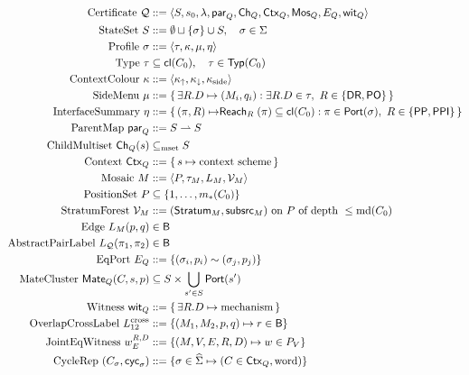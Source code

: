 \documentclass[11pt]{article}
\newcommand{\Base}{\mathsf{B}}
\newcommand{\DR}{\mathsf{DR}}
\newcommand{\PO}{\mathsf{PO}}
\newcommand{\PP}{\mathsf{PP}}
\newcommand{\PPI}{\mathsf{PPI}}
\newcommand{\Cl}{\mathsf{cl}}
\newcommand{\Typ}{\mathsf{Typ}}
\newcommand{\Q}{\mathcal Q}
\newcommand{\Mos}{\mathsf{Mos}}
\newcommand{\Ctx}{\mathsf{Ctx}}
\newcommand{\parr}{\mathsf{par}}
\newcommand{\Port}{\mathsf{Port}}
\newcommand{\Mate}{\mathsf{Mate}}
\newcommand{\Reach}{\mathrel{\mathsf{Reach}}}
\newcommand{\Stratum}{\mathsf{Stratum}}
\newcommand{\Subsrc}{\mathsf{subsrc}}
\newcommand{\extSigma}{\widehat\Sigma}
\newcommand{\md}{\operatorname{md}}
\begin{document}
\begin{align*}
  \text{Certificate}\ \Q
    &::= \langle S, s_0, \lambda, \parr_Q, \mathsf{Ch}_Q, \Ctx_Q,
            \Mos_Q, E_Q, \mathsf{wit}_Q \rangle \\
  \text{StateSet}\ S
    &::= \emptyset \sqcup \{\sigma\}\cup S,\quad \sigma\in\Sigma \\
  \text{Profile}\ \sigma
    &::= \langle \tau, \kappa, \mu, \eta \rangle \\
  \text{Type}\ \tau
    &\subseteq \Cl(C_0),\quad \tau\in\Typ(C_0) \\
  \text{ContextColour}\ \kappa
    &::= \langle \kappa_\uparrow,\kappa_\downarrow,
              \kappa_{\mathrm{side}}\rangle \\
  \text{SideMenu}\ \mu
    &::= \{\,\exists R.D\mapsto(M_i,q_i):
              \exists R.D\in\tau,\ R\in\{\DR,\PO\}\,\} \\
  \text{InterfaceSummary}\ \eta
    &::= \{\,(\pi,R)\mapsto \Reach_R(\pi)\subseteq\Cl(C_0):
              \pi\in\Port(\sigma),\ R\in\{\PP,\PPI\}\,\} \\
  \text{ParentMap}\ \parr_Q
    &::= S\rightharpoonup S \\
  \text{ChildMultiset}\ \mathsf{Ch}_Q(s)
    &\subseteq_{\mathrm{mset}} S \\
  \text{Context}\ \Ctx_Q
    &::= \{\,s\mapsto\text{context scheme}\,\} \\
  \text{Mosaic}\ M
    &::= \langle P,\tau_M, L_M, \mathcal V_M\rangle \\
  \text{PositionSet}\ P
    &\subseteq \{1,\dots,m_*(C_0)\} \\
  \text{StratumForest}\ \mathcal V_M
    &::= (\Stratum_M, \Subsrc_M)\text{ on }P
       \text{ of depth }\le\md(C_0) \\
  \text{Edge}\ L_M(p,q)
    &\in \Base \\
  \text{AbstractPairLabel}\ L_\Q(\pi_1,\pi_2)
    &\in \Base \\
  \text{EqPort}\ E_Q
    &::= \{(\sigma_i,p_i)\sim(\sigma_j,p_j)\} \\
  \text{MateCluster}\ \Mate_Q(C,s,p)
    &\subseteq S\times\bigcup_{s'\in S}\Port(s') \\
  \text{Witness}\ \mathsf{wit}_Q
    &::= \{\,\exists R.D\mapsto\text{mechanism}\,\} \\
  \text{OverlapCrossLabel}\ L_{12}^{\rm cross}
    &::= \{(M_1,M_2,p,q)\mapsto r\in\Base\} \\
  \text{JointEqWitness}\ w_E^{R,D}
    &::= \{(M,V,E,R,D)\mapsto w\in P_V\} \\
  \text{CycleRep}\ (C_\sigma,\mathsf{cyc}_\sigma)
    &::= \{\sigma\in\extSigma\mapsto(C\in\Ctx_Q,\text{word})\}
\end{align*}
\end{document}
